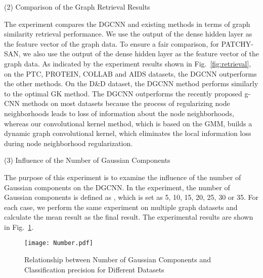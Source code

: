 \documentclass[11pt]{article}
\begin{document}
(2) Comparison of the Graph Retrieval Results



The experiment compares the DGCNN and existing methods in terms of graph similarity retrieval performance. We use the output of the dense hidden layer as the feature vector of the graph data. To ensure a fair comparison, for PATCHY-SAN, we also use the output of the dense hidden layer as the feature vector of the graph data. As indicated by the experiment results shown in Fig.~\ref{fig:retrieval}, on the PTC, PROTEIN, COLLAB and AIDS datasets, the DGCNN outperforms the other methods. On the D\&D dataset, the DGCNN method performs similarly to the optimal GK method. The DGCNN outperforms the recently proposed g-CNN methods on most datasets because the process of regularizing node neighborhoods leads to loss of information about the node neighborhoods, whereas our convolutional kernel method, which is based on the GMM, builds a dynamic graph convolutional kernel, which eliminates the local information loss during node neighborhood regularization.

(3) Influence of the Number of Gaussian Components


The purpose of this experiment is to examine the influence of the number of Gaussian components on the DGCNN. In the experiment, the number of Gaussian components is defined as , which is set as 5, 10, 15, 20, 25, 30 or 35. For each case, we perform the same experiment on multiple graph datasets and calculate the mean result as the final result. The experimental results are shown in Fig.~\ref{fig:number}.

\begin{figure}
\vspace{-0.1in}
\centering
\texttt{[image: Number.pdf]}
\vspace{-0.1in}
\caption{Relationship between Number of Gaussian Components and Classification precision for Different Datasets}\label{fig:number}
\end{figure}
\end{document}
